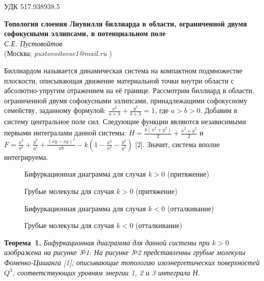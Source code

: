 \small УДК 517.938938.5

\begin{center}{ \bf  Топология слоения Лиувилля биллиарда в области, ограниченной двумя софокусными эллипсами, в потенциальном поле}\\
{\it С.Е. Пустовойтов } \\
(Москва; {\it pustovoitovse1@mail.ru} )
\end{center}


Биллиардом называется динамическая система на компактном подмножестве плоскости, описывающая  движение материальной точки внутри области  с абсолютно-упругим отражением на её границе. Рассмотрим биллиард в области, ограниченной двумя софокусными эллипсами, принадлежащими софокусному семейству, заданному формулой: $\frac{x^2}{a+\lambda}+\frac{y
^2}{b+\lambda}=1$, где $a>b>0$. Добавим в систему центральное поле сил. Следующие функции являются независимыми первыми интегралами данной системы: $H=\frac{k(x^2+y^2)}{2}+\frac{\dot{x}^2+\dot{y}^2}{2}$ и $F=\frac{\dot{x}^2}{a^2}+\frac{\dot{y}^2}{b^2}+\frac{(x\dot{y}-\dot{x}y)^2}{ab}-k(1-\frac{x^2}{a^2}-\frac{y^2}{b^2})$ [2].
Значит, система вполне интегрируема.


\begin{figure}[h!]
  \caption{Бифуркационная диаграмма для случая $k>0$ (притяжение)} \label{void}
\end{figure}

\begin{figure}[h!]
  \caption{Грубые молекулы для случая $k>0$ (притяжение)}\label{void}
\end{figure}

\begin{figure}[h!]
  \caption{Бифуркационная диаграмма для случая $k<0$ (отталкивание)}\label{void}
\end{figure}

\begin{figure}[h!]
  \caption{Грубые молекулы для случая $k<0$ (отталкивание)}\label{void}
\end{figure}


\textbf{Теорема~1.} {\it Бифуркационная диаграмма для данной системы при $k>0$ изображена на рисунке №1. На рисунке №2 представленны грубые молекулы Фоменко-Цишанга [1], описывающие топологию изоэнергетических поверхностей $Q^3$, соответствующих уровням энергии 1, 2 и 3 интеграла Н.
}

